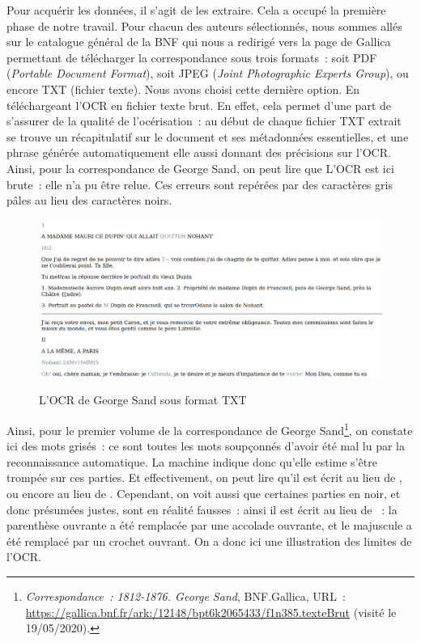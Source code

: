 Pour acquérir les données, il s'agit de les extraire. Cela a occupé la première phase de notre travail. 
Pour chacun des auteurs sélectionnés, nous sommes allés sur le catalogue général de la BNF qui nous a redirigé vers la page de Gallica permettant de télécharger la correspondance sous trois formats~: soit PDF (\emph{Portable Document Format}), soit JPEG (\emph{Joint Photographic Experts Group}), ou encore TXT (fichier texte). Nous avons choisi cette dernière option. En téléchargeant l'OCR en fichier texte brut.
En effet, cela permet d'une part de s'assurer de la qualité de l'océrisation~: au début de chaque fichier TXT extrait se trouve un récapitulatif sur le document et ses métadonnées essentielles, et une phrase générée automatiquement elle aussi donnant des précisions sur l'OCR. Ainsi, pour la correspondance de George Sand, on peut lire que  L'OCR est ici brute~: elle n'a pu être relue. Ces erreurs sont repérées par des caractères gris pâles au lieu des caractères noirs.

\begin{figure}[ht]
    \centering
    \caption{L'OCR de George Sand sous format TXT}
    \includegraphics[width=16cm]{images/sand-ocr.png}
    \label{sand-ocr}
\end{figure}

Ainsi, pour le premier volume de la correspondance de George Sand\footnote{\emph{Correspondance~: 1812-1876. George Sand}, BNF.Gallica, URL~: \url{https://gallica.bnf.fr/ark:/12148/bpt6k2065433/f1n385.texteBrut} (visité le 19/05/2020).}, on constate ici des mots grisés~: ce sont toutes les mots soupçonnés d'avoir été mal lu par la reconnaissance automatique. La machine indique donc qu'elle estime s'être trompée sur ces parties. Et effectivement, on peut lire qu'il est écrit  au lieu de , ou encore  au lieu de . 
Cependant, on voit aussi que certaines parties en noir, et donc présumées justes, sont en réalité fausses~: ainsi il est écrit \inquote{\{[ndre)} au lieu de ~: la parenthèse ouvrante a été remplacée par une accolade ouvrante, et le  majuscule a été remplacé par un crochet ouvrant. On a donc ici une illustration des limites de l'OCR.

